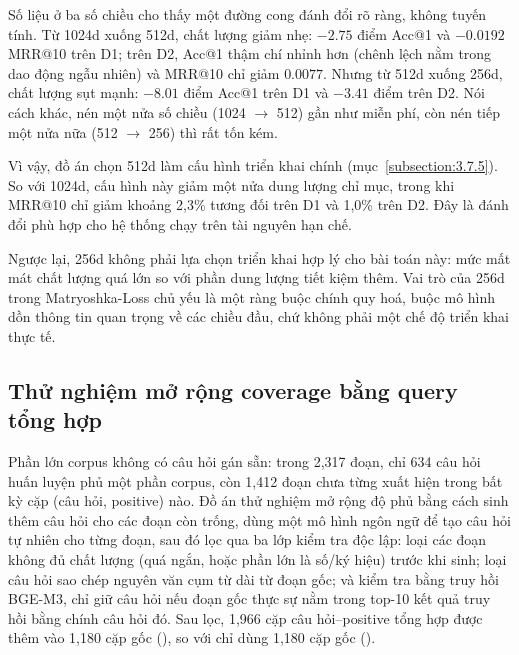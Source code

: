 \documentclass[../DoAn.tex]{subfiles}
\begin{document}
Số liệu ở ba số chiều cho thấy một đường cong đánh đổi rõ ràng, không tuyến tính. Từ 1024d xuống 512d, chất lượng giảm nhẹ: $-2.75$ điểm Acc@1 và $-0.0192$ MRR@10 trên D1; trên D2, Acc@1 thậm chí nhỉnh hơn (chênh lệch nằm trong dao động ngẫu nhiên) và MRR@10 chỉ giảm $0.0077$. Nhưng từ 512d xuống 256d, chất lượng sụt mạnh: $-8.01$ điểm Acc@1 trên D1 và $-3.41$ điểm trên D2. Nói cách khác, nén một nửa số chiều (1024 $\to$ 512) gần như miễn phí, còn nén tiếp một nửa nữa (512 $\to$ 256) thì rất tốn kém.

Vì vậy, đồ án chọn 512d làm cấu hình triển khai chính (mục~\ref{subsection:3.7.5}). So với 1024d, cấu hình này giảm một nửa dung lượng chỉ mục, trong khi MRR@10 chỉ giảm khoảng 2,3\% tương đối trên D1 và 1,0\% trên D2. Đây là đánh đổi phù hợp cho hệ thống chạy trên tài nguyên hạn chế.

Ngược lại, 256d không phải lựa chọn triển khai hợp lý cho bài toán này: mức mất mát chất lượng quá lớn so với phần dung lượng tiết kiệm thêm. Vai trò của 256d trong Matryoshka-\allowbreak Loss chủ yếu là một ràng buộc chính quy hoá, buộc mô hình dồn thông tin quan trọng về các chiều đầu, chứ không phải một chế độ triển khai thực tế.

\subsection{Thử nghiệm mở rộng coverage bằng query tổng hợp}
\label{subsection:4.3.4}

Phần lớn corpus không có câu hỏi gán sẵn: trong 2,317 đoạn, chỉ 634 câu hỏi huấn luyện phủ một phần corpus, còn 1,412 đoạn chưa từng xuất hiện trong bất kỳ cặp (câu hỏi, positive) nào. Đồ án thử nghiệm mở rộng độ phủ bằng cách sinh thêm câu hỏi cho các đoạn còn trống, dùng một mô hình ngôn ngữ để tạo câu hỏi tự nhiên cho từng đoạn, sau đó lọc qua ba lớp kiểm tra độc lập: loại các đoạn không đủ chất lượng (quá ngắn, hoặc phần lớn là số/ký hiệu) trước khi sinh; loại câu hỏi sao chép nguyên văn cụm từ dài từ đoạn gốc; và kiểm tra bằng truy hồi BGE-M3, chỉ giữ câu hỏi nếu đoạn gốc thực sự nằm trong top-10 kết quả truy hồi bằng chính câu hỏi đó. Sau lọc, 1,966 cặp câu hỏi--positive tổng hợp được thêm vào 1,180 cặp gốc (), so với chỉ dùng 1,180 cặp gốc ().
\end{document}
